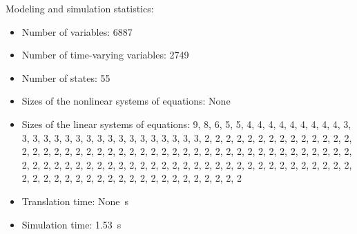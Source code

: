 \begin{contextbox}
  Modeling and simulation statistics:
  \begin{itemize}
    \item Number of variables: 6887
    \item Number of time-varying variables: 2749
    \item Number of states: 55
    \item Sizes of the nonlinear systems of equations: None
    \item Sizes of the linear systems of equations: 9, 8, 6, 5, 5, 4, 4, 4, 4, 4, 4, 4, 4, 4, 3, 3, 3, 3, 3, 3, 3, 3, 3, 3, 3, 3, 3, 3, 3, 3, 3, 3, 2, 2, 2, 2, 2, 2, 2, 2, 2, 2, 2, 2, 2, 2, 2, 2, 2, 2, 2, 2, 2, 2, 2, 2, 2, 2, 2, 2, 2, 2, 2, 2, 2, 2, 2, 2, 2, 2, 2, 2, 2, 2, 2, 2, 2, 2, 2, 2, 2, 2, 2, 2, 2, 2, 2, 2, 2, 2, 2, 2, 2, 2, 2, 2, 2, 2, 2, 2, 2, 2, 2, 2, 2, 2, 2, 2, 2, 2, 2, 2, 2, 2, 2, 2, 2, 2, 2, 2, 2, 2, 2, 2, 2, 2, 2, 2, 2
    \item Translation time: \SI{None}{s}
    \item Simulation time: \SI{1.53}{s}
  \end{itemize}
\end{contextbox}